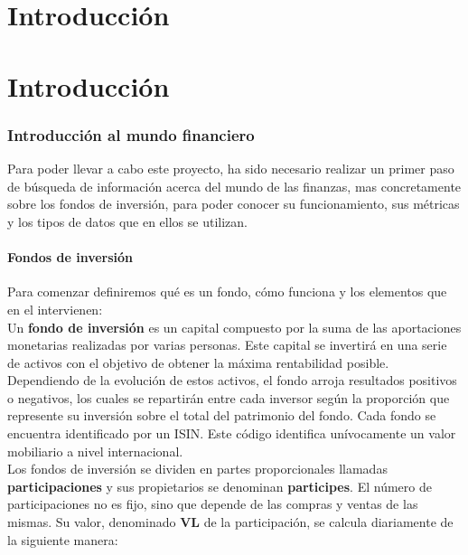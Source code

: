 \documentclass[12pt, a4paper]{article}
\newcommand*\parttitle{}
\let\origpart\part
\renewcommand*{\part}[2][]{%
	\ifx\\#1\\%
	\origpart{#2}%
	\renewcommand*\parttitle{#2}%
	\else
	\origpart[#1]{#2}%
	\renewcommand*\parttitle{#1}%
	\fi
}
\begin{document}
\newpage
\tableofcontents
\newpage

\part{Introducción}
\section{Introducción al mundo financiero}
Para poder llevar a cabo este proyecto, ha sido necesario realizar un primer paso de búsqueda de información acerca del mundo de las finanzas, mas concretamente sobre los fondos de inversión, para poder conocer su funcionamiento, sus métricas y los tipos de datos que en ellos se utilizan.\\

\subsection{Fondos de inversión}

Para comenzar definiremos qué es un fondo, cómo funciona y los elementos que en el intervienen:\\

Un \textbf{fondo de inversión} es un capital compuesto por la suma de las aportaciones monetarias realizadas por varias personas. Este capital se invertirá en una serie de activos con el objetivo de obtener la máxima rentabilidad posible. Dependiendo de la evolución de estos activos, el fondo arroja resultados positivos o negativos, los cuales se repartirán entre cada inversor según la proporción que represente su inversión sobre el total del patrimonio del fondo. Cada fondo se encuentra identificado por un \gls{ISIN}. Este código identifica unívocamente un valor mobiliario a nivel internacional.\\

Los fondos de inversión se dividen en partes proporcionales llamadas \textbf{participaciones} y sus propietarios se denominan \textbf{participes}. El número de participaciones no es fijo, sino que depende de las compras y ventas de las mismas. Su valor, denominado \textbf{\gls{VL}} de la participación, se calcula diariamente de la siguiente manera: 
	
\end{document}
